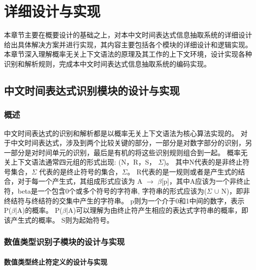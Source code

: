 
\chapter{详细设计与实现}

本章节主要在概要设计的基础之上，对本中文时间表达式信息抽取系统的详细设计给出具体解决方案并进行实现，其内容主要包括各个模块的详细设计和逻辑实现。
本章节深入理解概率无关上下文语法的原理及其工作的上下文环境，设计实现各种识别和解析规则，完成本中文时间表达式信息抽取系统的编码实现。

\section{中文时间表达式识别模块的设计与实现}

\subsection{概述}

中文时间表达式的识别和解析都是以概率无关上下文语法为核心算法实现的。
对于中文时间表达式，涉及到两个比较关键的部分，一部分是对数字部分的识别，另一部分是对时间单元的识别，最后是有机的将这些识别规则组合到一起。
概率无关上下文语法通常四元组的形式出现: (N，R，S， $\varSigma$)。 其中N代表的是非终止符号集合，$\varSigma$ 代表的是终止符号的集合，$\varSigma$。
R代表的是一规则或者是产生式的结合，对于每一个产生式，其组成形式应该为 A $\rightarrow$ $\beta$[p]，其中A应该为一个非终止符，beta是一个包含0个或多个符号的字符串,
字符串的形式应该为($\varSigma$ $\cup$ N)，即非终结符与终结符的交集中产生的字符串。 p则为一个介于0和1中间的数字，表示 P($\beta$|A)的概率。
P($\beta$|A)可以理解为由终止符产生相应的表达式字符串的概率，即该产生式的概率。
S则为起始符号。


\subsection{数值类型识别子模块的设计与实现}

\subsubsection{数值类型终止符定义的设计与实现}

